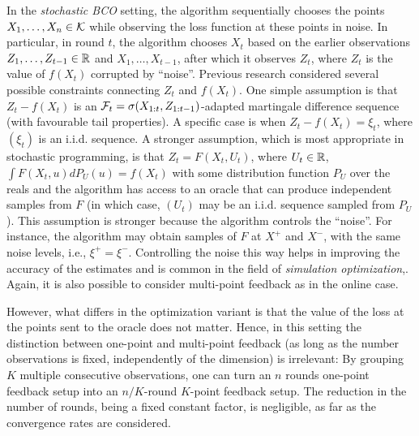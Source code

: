 In the \emph{stochastic BCO} setting,
the algorithm sequentially chooses the points $X_1,\dots,X_n\in \mathcal{K}$ while observing the loss function at these points in noise.
In particular, in round $t$, the algorithm chooses $X_t$ based on the earlier observations $Z_1,\dots,Z_{t-1}\in \mathbb{R}$ and $X_1,\dots,X_{t-1}$, after which it observes $Z_t$, where $Z_t$ is the value of $f(X_t)$ corrupted by ``noise''.
Previous research considered several possible constraints connecting $Z_t$ and $f(X_t)$.
One simple assumption is that $Z_t-f(X_t)$ is an $\mathcal{F}_t = \sigma(X_{1:t},Z_{1:t-1})$-adapted martingale difference sequence (with favourable tail properties).
A specific case is when $Z_t - f(X_t) = \xi_t$, where $(\xi_t)$ is an i.i.d. sequence.
A stronger assumption, which is most appropriate in stochastic programming,
is that $Z_t = F(X_t,U_t)$, where $U_t\in \mathbb{R}$, $\int F(X_t,u) dP_U(u) = f(X_t)$ with some distribution function $P_U$ over the reals and the algorithm has access to an oracle that can produce independent samples from $F$ (in which case, $(U_t)$ may be an i.i.d. sequence sampled from $P_U$).
This assumption is stronger because the algorithm controls the
``noise''.
For instance, the algorithm may obtain samples of $F$ at $X^+$ and $X^-$, with the same noise levels, i.e., $\xi^+=\xi^-$.
Controlling the noise this way helps in improving the accuracy of the estimates and is common in the field of \textit{simulation optimization},.
Again, it is also possible to consider multi-point feedback as in the online case.

However, what differs in the optimization variant is that the value of the loss at the points sent to the oracle does not matter.
Hence, in this setting the distinction between one-point and multi-point feedback (as long as the number observations is fixed, independently of the dimension) is irrelevant:
By grouping $K$ multiple consecutive observations, one can turn an $n$ rounds one-point feedback setup into an $n/K$-round $K$-point feedback setup. The reduction in the number of rounds, being a fixed constant factor, is negligible, as far as the convergence rates are considered.

